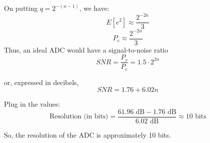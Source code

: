 \documentclass[journal,12pt,onecolumn]{IEEEtran}
\begin{document}
On putting \(q = 2^{-(n-1)}\), we have:
\begin{equation}
E[e^{2}] \approx \frac{2^{-2n}}{3}
\end{equation}
\begin{equation}
P_e \approx \frac{2^{-2n}}{3}
\end{equation}
Thus, an ideal ADC would have a signal-to-noise ratio
\begin{equation}
SNR = \frac{P_s}{P_e} = 1.5 \cdot 2^{2n}
\end{equation}

or, expressed in decibels,
\begin{equation}
SNR = 1.76 + 6.02n
\end{equation}

Plug in the values:
\begin{equation}
\text{Resolution (in bits)} = \frac{61.96 \text{ dB} - 1.76 \text{ dB}}{6.02 \text{ dB}} \approx 10 \text{ bits}
\end{equation}

So, the resolution of the ADC is approximately 10 bits.
\end{document}
